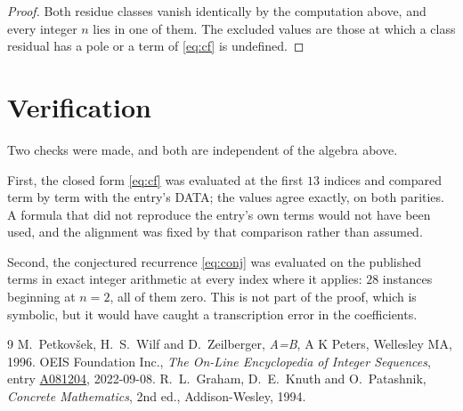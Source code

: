 \documentclass[11pt,a4paper]{article}
\theoremstyle{plain}
\theoremstyle{definition}
\begin{document}
\begin{proof}
Both residue classes vanish identically by the computation above, and every integer $n$
lies in one of them. The excluded values are those at which a class residual has a pole or
a term of \eqref{eq:cf} is undefined.
\end{proof}

\section{Verification}

Two checks were made, and both are independent of the algebra above.

First, the closed form \eqref{eq:cf} was evaluated at the first $13$ indices and
compared term by term with the entry's DATA; the values agree exactly, on both parities. A
formula that did not reproduce the entry's own terms would not have been used, and the
alignment was fixed by that comparison rather than assumed.

Second, the conjectured recurrence \eqref{eq:conj} was evaluated on the published terms in
exact integer arithmetic at every index where it applies: $28$ instances beginning at
$n=2$, all of them zero. This is not part of the proof, which is symbolic, but it
would have caught a transcription error in the coefficients.

\begin{thebibliography}{9}
 M.~Petkov\v{s}ek, H.~S.~Wilf and D.~Zeilberger, \emph{A=B}, A K Peters,
Wellesley MA, 1996.
 OEIS Foundation Inc., \emph{The On-Line Encyclopedia of Integer Sequences},
entry \href{https://oeis.org/A081204}{A081204}, 2022-09-08.
 R.~L.~Graham, D.~E.~Knuth and O.~Patashnik, \emph{Concrete Mathematics},
2nd ed., Addison-Wesley, 1994.
\end{thebibliography}
\end{document}
